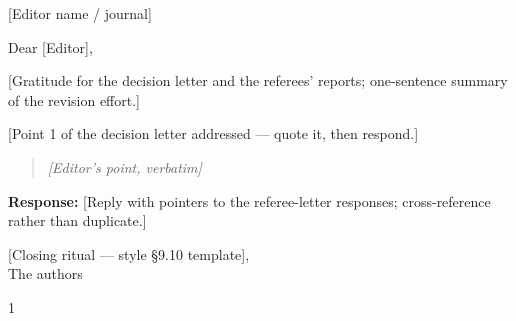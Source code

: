 \documentclass[12pt]{letter}
\begin{document}
\begin{letter}{[Editor name / journal]}

\opening{Dear [Editor],}

[Gratitude for the decision letter and the referees' reports; one-sentence summary of the revision effort.]

[Point 1 of the decision letter addressed — quote it, then respond.]

\begin{quote}\itshape
[Editor's point, verbatim]
\end{quote}

\textbf{Response:} [Reply with pointers to the referee-letter responses; cross-reference rather than duplicate.]


\closing{[Closing ritual — style §9.10 template],\\ The authors}

\end{letter}

\begin{spacing}{1}


\end{spacing}
\end{document}
